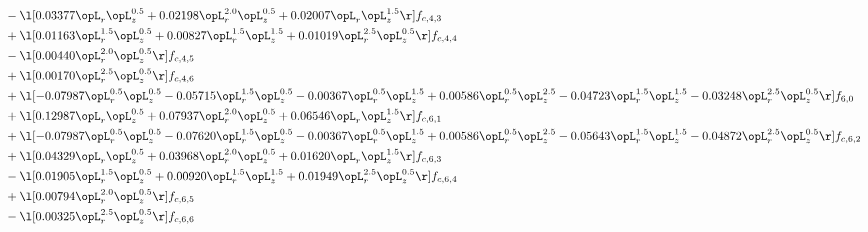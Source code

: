 \begin{alignat}{2}
& - \l[  0.03377 \opL_r \opL_z^{0.5} +  0.02198 \opL_r^{2.0} \opL_z^{0.5} +  0.02007 \opL_r \opL_z^{1.5}  \r] f_{c,4,3} \nonumber \\ 
& + \l[  0.01163 \opL_r^{1.5} \opL_z^{0.5} +  0.00827 \opL_r^{1.5} \opL_z^{1.5} +  0.01019 \opL_r^{2.5} \opL_z^{0.5}  \r] f_{c,4,4} \nonumber \\ 
& - \l[  0.00440 \opL_r^{2.0} \opL_z^{0.5}  \r] f_{c,4,5} \nonumber \\ 
& + \l[  0.00170 \opL_r^{2.5} \opL_z^{0.5}  \r] f_{c,4,6} \nonumber \\ 
& + \l[  -0.07987 \opL_r^{0.5} \opL_z^{0.5}   -0.05715 \opL_r^{1.5} \opL_z^{0.5}   -0.00367 \opL_r^{0.5} \opL_z^{1.5} +  0.00586 \opL_r^{0.5} \opL_z^{2.5}   -0.04723 \opL_r^{1.5} \opL_z^{1.5}   -0.03248 \opL_r^{2.5} \opL_z^{0.5}  \r] f_{6,0} \nonumber \\ 
& + \l[  0.12987 \opL_r \opL_z^{0.5} +  0.07937 \opL_r^{2.0} \opL_z^{0.5} +  0.06546 \opL_r \opL_z^{1.5}  \r] f_{c,6,1} \nonumber \\ 
& + \l[  -0.07987 \opL_r^{0.5} \opL_z^{0.5}   -0.07620 \opL_r^{1.5} \opL_z^{0.5}   -0.00367 \opL_r^{0.5} \opL_z^{1.5} +  0.00586 \opL_r^{0.5} \opL_z^{2.5}   -0.05643 \opL_r^{1.5} \opL_z^{1.5}   -0.04872 \opL_r^{2.5} \opL_z^{0.5}  \r] f_{c,6,2} \nonumber \\ 
& + \l[  0.04329 \opL_r \opL_z^{0.5} +  0.03968 \opL_r^{2.0} \opL_z^{0.5} +  0.01620 \opL_r \opL_z^{1.5}  \r] f_{c,6,3} \nonumber \\ 
& - \l[  0.01905 \opL_r^{1.5} \opL_z^{0.5} +  0.00920 \opL_r^{1.5} \opL_z^{1.5} +  0.01949 \opL_r^{2.5} \opL_z^{0.5}  \r] f_{c,6,4} \nonumber \\ 
& + \l[  0.00794 \opL_r^{2.0} \opL_z^{0.5}  \r] f_{c,6,5} \nonumber \\ 
& - \l[  0.00325 \opL_r^{2.5} \opL_z^{0.5}  \r] f_{c,6,6} \nonumber \\ 
\end{alignat} 


